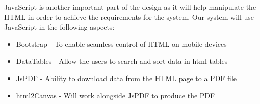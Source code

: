 \documentclass[../main.tex]{subfiles}
\begin{document}
\raggedright
JavaScript is another important part of the design as it will help manipulate the HTML in order to achieve the requirements for the system. Our system will use JavaScript in the following aspects:
\begin{itemize}
	\item Bootstrap\cite{bootstrapfour} - To enable seamless control of HTML on mobile devices
	\item DataTables\cite{datatables} - Allow the users to search and sort data in html tables
	\item JsPDF\cite{jsPDF} - Ability to download data from the HTML page to a PDF file
	\item html2Canvas\cite{htmlcanvas} - Will work alongside JsPDF to produce the PDF
\end{itemize}
\end{document}
